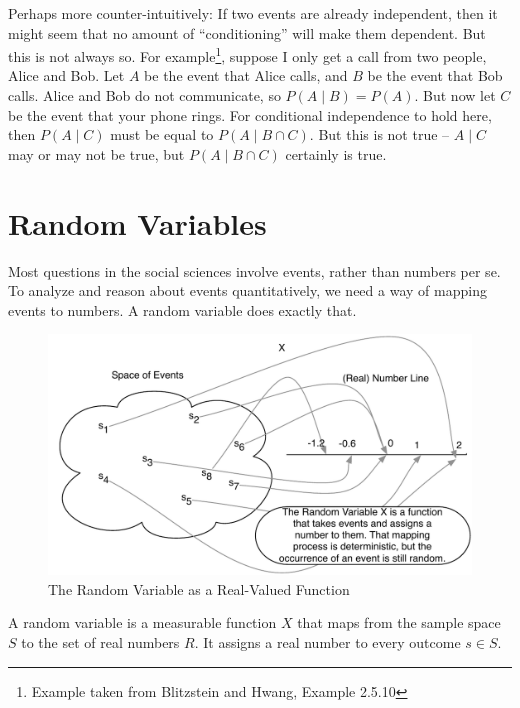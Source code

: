\documentclass[]{book}
\let\rmarkdownfootnote\footnote%
\def\footnote{\protect\rmarkdownfootnote}
\theoremstyle{definition}
\theoremstyle{definition}
\theoremstyle{definition}
\theoremstyle{remark}
\let\BeginKnitrBlock\begin \let\EndKnitrBlock\end
\begin{document}
Perhaps more counter-intuitively: If two events are already independent,
then it might seem that no amount of ``conditioning'' will make them
dependent. But this is not always so. For example\footnote{Example taken
  from Blitzstein and Hwang, Example 2.5.10}, suppose I only get a call
from two people, Alice and Bob. Let \(A\) be the event that Alice calls,
and \(B\) be the event that Bob calls. Alice and Bob do not communicate,
so \(P(A \mid B) = P(A).\) But now let \(C\) be the event that your
phone rings. For conditional independence to hold here, then
\(P(A \mid C)\) must be equal to \(P(A \mid B \cap C).\) But this is not
true -- \(A \mid C\) may or may not be true, but \(P(A \mid B \cap C)\)
certainly is true.

\section{Random Variables}\label{random-variables}

Most questions in the social sciences involve events, rather than
numbers per se. To analyze and reason about events quantitatively, we
need a way of mapping events to numbers. A random variable does exactly
that.

\begin{figure}
\centering
\includegraphics{images/rv.pdf}
\caption{\label{fig:rv-image}The Random Variable as a Real-Valued Function}
\end{figure}

\BeginKnitrBlock{definition}[Random Variable]
\protect\hypertarget{def:unnamed-chunk-71}{}{\label{def:unnamed-chunk-71}
{} } A random variable is a measurable
function \(X\) that maps from the sample space \(S\) to the set of real
numbers \(R.\) It assigns a real number to every outcome \(s \in S\).
\EndKnitrBlock{definition}
\end{document}
